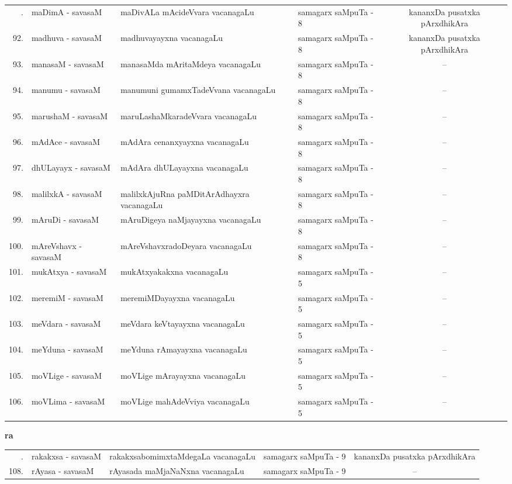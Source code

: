 {\renewcommand{\arraystretch}{1.35}
\begin{longtable}{rl>{\raggedright}p{5.5cm}lc}
\endfirsthead
\endhead
\endfoot
\endlastfoot
91. & maDimA - savasaM &  maDivALa mAcideVvara vacanagaLu & samagarx saMpuTa - 8 & kananxDa pusatxka pArxdhikAra\\
92. & madhuva - savasaM &  madhuvayayxna vacanagaLu & samagarx saMpuTa - 8 & kananxDa pusatxka pArxdhikAra\\
93. & manasaM - savasaM & manasaMda mAritaMdeya vacanagaLu & samagarx saMpuTa - 8 & --\\
94. & manumu - savasaM & manumuni gumamxTadeVvana vacanagaLu & samagarx saMpuTa - 8 & --\\
95. & marushaM - savasaM & maruLashaMkaradeVvara vacanagaLu & samagarx saMpuTa - 8 & --\\
96. & mAdAce - savasaM & mAdAra cenanxyayxna vacanagaLu & samagarx saMpuTa - 8 & --\\
97. & dhULayayx - savasaM & mAdAra dhULayayxna vacanagaLu & samagarx saMpuTa - 8 & --\\
98. & malilxkA - savasaM & malilxkAjuRna paMDitArAdhayxra\newline \phantom{AA} vacanagaLu & samagarx saMpuTa - 8 & --\\
99. & mAruDi - savasaM & mAruDigeya naMjayayxna vacanagaLu & samagarx saMpuTa - 8 & --\\
100. & mAreVshavx - savasaM & mAreVshavxradoDeyara vacanagaLu & samagarx saMpuTa - 8 & --\\
101. & mukAtxya - savasaM & mukAtxyakakxna vacanagaLu & samagarx saMpuTa - 5 & --\\
102. & meremiM - savasaM & meremiMDayayxna vacanagaLu & samagarx saMpuTa - 5 & --\\
103. & meVdara - savasaM & meVdara keVtayayxna vacanagaLu & samagarx saMpuTa - 5 & --\\
104. & meYduna - savasaM & meYduna rAmayayxna vacanagaLu & samagarx saMpuTa - 5 & --\\
105. & moVLige - savasaM & moVLige mArayayxna vacanagaLu & samagarx saMpuTa - 5 & --\\
106. & moVLima - savasaM & moVLige mahAdeVviya vacanagaLu & samagarx saMpuTa - 5 & --\\
\end{longtable}}
\smallskip

\centerline{\bf ra}

{\renewcommand{\arraystretch}{1.3}
\begin{longtable}{rl>{\raggedright}p{5.5cm}lc}
\endfirsthead
\endhead
\endfoot
\endlastfoot
107. & rakakxsa - savasaM & rakakxsabomimxtaMdegaLa vacanagaLu &  samagarx saMpuTa - 9 & kananxDa pusatxka pArxdhikAra\\
108. & rAyasa - savasaM &  rAyasada maMjaNaNxna vacanagaLu & samagarx saMpuTa - 9 & --\\
\end{longtable}}

